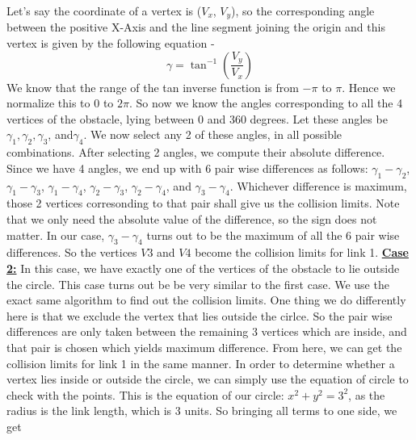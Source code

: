 \documentclass[12pt]{article}
\begin{document}
\newline
Let's say the coordinate of a vertex is ($V_x$, $V_y$), so the corresponding angle between the positive X-Axis and the line segment joining the origin and this vertex is given by the following equation - $$\gamma = \tan^{-1}{(\frac{V_y}{V_x})}$$
\newline
We know that the range of the tan inverse function is from $-\pi$ to $\pi$. Hence we normalize this to $0$ to $2\pi$. So now we know the angles corresponding to all the 4 vertices of the obstacle, lying between 0 and 360 degrees. Let these angles be $\gamma_1, \gamma_2, \gamma_3$, and$ \gamma_4$.
\newline
We now select any 2 of these angles, in all possible combinations. After selecting 2 angles, we compute their absolute difference. Since we have 4 angles, we end up with 6 pair wise differences as follows:
$\gamma_1 - \gamma_2$, $\gamma_1 - \gamma_3$, $\gamma_1 - \gamma_4$, $\gamma_2 - \gamma_3$, $\gamma_2 - \gamma_4$, and 
$\gamma_3 - \gamma_4$.
Whichever difference is maximum, those 2 vertices corresonding to that pair shall give us the collision limits. Note that we only need the absolute value of the difference, so the sign does not matter. In our case, $\gamma_3 - \gamma_4$ turns out to be the maximum of all the 6 pair wise differences. So the vertices $V3$ and $V4$ become the collision limits for link 1.
\newline
\newline
\underline{\textbf{Case 2:}}
\newline
In this case, we have exactly one of the vertices of the obstacle to lie outside the circle. This case turns out be be very similar to the first case. We use the exact same algorithm to find out the collision limits. One thing we do differently here is that we exclude the vertex that lies outside the cirlce. So the pair wise differences are only taken between the remaining 3 vertices which are inside, and that pair is chosen which yields maximum difference. From here, we can get the collision limits for link 1 in the same manner. 
\newline
\newline
In order to determine whether a vertex lies inside or outside the circle, we can simply use the equation of circle to check with the points.
\newline
This is the equation of our circle: $x^2 + y^2 = 3^2$, as the radius is the link length, which is 3 units.
So bringing all terms to one side, we get
\end{document}
